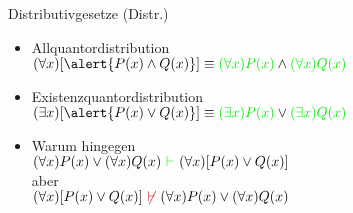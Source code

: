 \begin{frame}
  {Distributivgesetze (Distr.)}
  \begin{itemize}[<+->]
    \item Allquantordistribution\\
      $(\forall x)[\alert{P(x)\wedge Q(x)}] \equiv \gruen{(\forall x)P(x)}\wedge\gruen{(\forall x)Q(x)}$
      \Halbzeile
    \item Existenzquantordistribution\\
      $(\exists x)[\alert{P(x)\vee Q(x)}] \equiv \gruen{(\exists x)P(x)}\vee\gruen{(\exists x)Q(x)}$
      \Halbzeile
    \item Warum hingegen\\
      $(\forall x)P(x)\vee(\forall x)Q(x)\ \gruen{\vdash}\ (\forall x)[P(x)\vee Q(x)]$\\
      aber\\
      $(\forall x)[P(x)\vee Q(x)]\ \rot{\not\vdash}\ (\forall x)P(x)\vee(\forall x)Q(x)$\\
  \end{itemize}
\end{frame}

